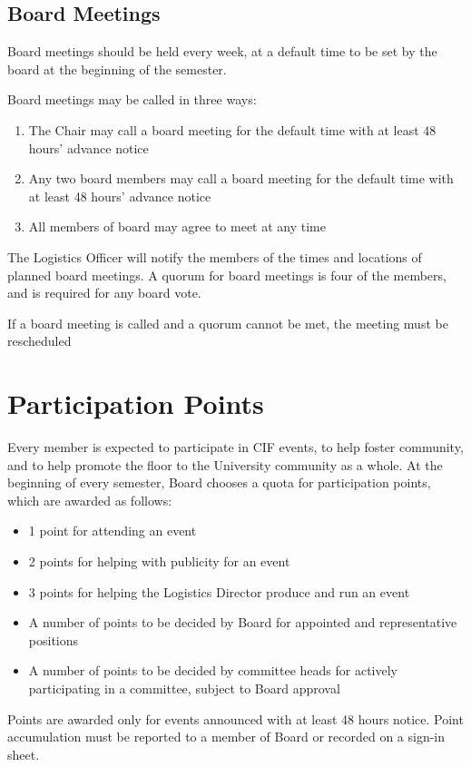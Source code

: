 \documentclass[12pt]{amsart}
\begin{document}
\subsection {Board Meetings}
Board meetings should be held every week, at a default time to be set by the board at the beginning of the semester.

Board meetings may be called in three ways:
\begin{enumerate}
	\item The Chair may call a board meeting for the default time with at least 48 hours' advance notice
	\item Any two board members may call a board meeting for the default time with at least 48 hours' advance notice
	\item All members of board may agree to meet at any time
\end{enumerate}

The Logistics Officer will notify the members of the times and locations of planned board meetings. A quorum for board meetings is four of the members, and is required for any board vote.

If a board meeting is called and a quorum cannot be met, the meeting must be rescheduled

\section{Participation Points}
Every member is expected to participate in CIF events, to help foster community, and to help promote the floor to the University community as a whole. At the beginning of every semester, Board chooses a quota for participation points, which are awarded as follows:
\begin{itemize}
	\item 1 point for attending an event
	\item 2 points for helping with publicity for an event
	\item 3 points for helping the Logistics Director produce and run an event
	\item A number of points to be decided by Board for appointed and representative positions
	\item A number of points to be decided by committee heads for actively participating in a committee, subject to Board approval
\end{itemize}
Points are awarded only for events announced with at least 48 hours notice.  Point accumulation must be reported to a member of Board or recorded on a sign-in sheet.
\end{document}
